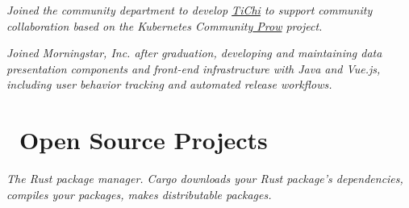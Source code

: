 \documentclass{software_engineer_dongpo_liu}
\newcommand{\en}[1]{#1}
\newcommand{\zh}[1]{}
\begin{document}
\en{}
\zh{\datedsubsection{\textbf{\href{https://pingcap.com/zh/}{PingCAP Inc. - 数据库 - 前后端开发工程师（Golang/JS）}}}{2020/08 -- 2021/07}}
\en{\textsl{Joined the community department to develop {\href{https://github.com/ti-community-infra/tichi}{TiChi}} to support community collaboration based on the Kubernetes Community{\href{https://github.com/kubernetes/test-infra/tree/master/prow}{ Prow}} project.}}
\zh{\textsl{加入了社区部门，以 Kubernetes 社区{\href{https://github.com/kubernetes/test-infra/tree/master/prow}{ Prow}} 项目为基础开发{\href{https://github.com/ti-community-infra/tichi}{ TiChi}} 来支撑社区协作。}}

\en{}
\zh{\datedsubsection{\textbf{\href{https://www.morningstar.com/}{晨星资讯（Morningstar, Inc.）- 金融服务 - 前后端开发工程师（Java/JavaScript）}}}{2019/06 -- 2020/07}}
\en{\textsl{Joined Morningstar, Inc. after graduation, developing and maintaining data presentation components and front-end infrastructure with Java and Vue.js, including user behavior tracking and automated release workflows.}}
\zh{\textsl{毕业后加入晨星资讯（Morningstar, Inc.），负责基于 Java 和 Vue.js 的数据展示组件及前端基础设施开发维护，参与用户行为追踪和自动化发布流程建设。}}

\section{\faGithubAlt\ \en{Open Source Projects}\zh{开源项目}}
\en{}
\zh{\datedsubsection{\textbf{Cargo(Rust) - 维护者}}{{\href{https://github.com/search?q=repo:rust-lang/cargo+repo:rust-lang/rust+author:0xPoe&type=commits}{301+ commits}}}}
\en{\textsl{The Rust package manager. Cargo downloads your Rust package's dependencies, compiles your packages, makes distributable packages.}}
\zh{\textsl{Rust 包管理器，Cargo 下载 Rust 包的依赖，编译包，制作可分发的包。}}
\end{document}
